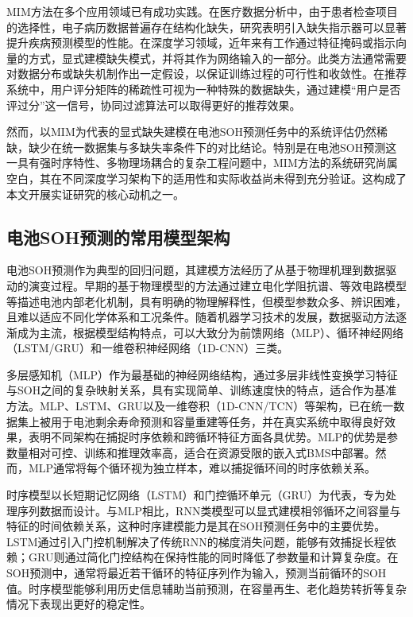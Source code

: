 \documentclass[10pt,a4paper]{ctexart}
\begin{document}
MIM方法在多个应用领域已有成功实践。在医疗数据分析中，由于患者检查项目的选择性，电子病历数据普遍存在结构化缺失，研究表明引入缺失指示器可以显著提升疾病预测模型的性能\cite{sisk2023imputation,ehrig2025imputation}。在深度学习领域，近年来有工作通过特征掩码或指示向量的方式，显式建模缺失模式，并将其作为网络输入的一部分\cite{ipsen2022deal,che2018recurrent}。此类方法通常需要对数据分布或缺失机制作出一定假设，以保证训练过程的可行性和收敛性。在推荐系统中，用户评分矩阵的稀疏性可视为一种特殊的数据缺失，通过建模“用户是否评过分”这一信号，协同过滤算法可以取得更好的推荐效果。

然而，以MIM为代表的显式缺失建模在电池SOH预测任务中的系统评估仍然稀缺，缺少在统一数据集与多缺失率条件下的对比结论。特别是在电池SOH预测这一具有强时序特性、多物理场耦合的复杂工程问题中，MIM方法的系统研究尚属空白，其在不同深度学习架构下的适用性和实际收益尚未得到充分验证。这构成了本文开展实证研究的核心动机之一。

\subsection{电池SOH预测的常用模型架构}

电池SOH预测作为典型的回归问题，其建模方法经历了从基于物理机理到数据驱动的演变过程\cite{liu2025deep}。早期的基于物理模型的方法通过建立电化学阻抗谱、等效电路模型等描述电池内部老化机制，具有明确的物理解释性，但模型参数众多、辨识困难，且难以适应不同化学体系和工况条件。随着机器学习技术的发展，数据驱动方法逐渐成为主流\cite{liu2025deep}，根据模型结构特点，可以大致分为前馈网络（MLP）、循环神经网络（LSTM/GRU）和一维卷积神经网络（1D-CNN）三类。

多层感知机（MLP）作为最基础的神经网络结构，通过多层非线性变换学习特征与SOH之间的复杂映射关系，具有实现简单、训练速度快的特点，适合作为基准方法\cite{bairwa2025cycle}。MLP、LSTM、GRU以及一维卷积（1D-CNN/TCN）等架构，已在统一数据集上被用于电池剩余寿命预测和容量重建等任务，并在真实系统中取得良好效果\cite{bairwa2025cycle}，表明不同架构在捕捉时序依赖和跨循环特征方面各具优势。MLP的优势是参数量相对可控、训练和推理效率高，适合在资源受限的嵌入式BMS中部署。然而，MLP通常将每个循环视为独立样本，难以捕捉循环间的时序依赖关系。

时序模型以长短期记忆网络（LSTM）和门控循环单元（GRU）为代表，专为处理序列数据而设计\cite{bairwa2025cycle}。与MLP相比，RNN类模型可以显式建模相邻循环之间容量与特征的时间依赖关系，这种时序建模能力是其在SOH预测任务中的主要优势。LSTM通过引入门控机制解决了传统RNN的梯度消失问题，能够有效捕捉长程依赖；GRU则通过简化门控结构在保持性能的同时降低了参数量和计算复杂度。在SOH预测中，通常将最近若干循环的特征序列作为输入，预测当前循环的SOH值。时序模型能够利用历史信息辅助当前预测，在容量再生、老化趋势转折等复杂情况下表现出更好的稳定性。
\end{document}
